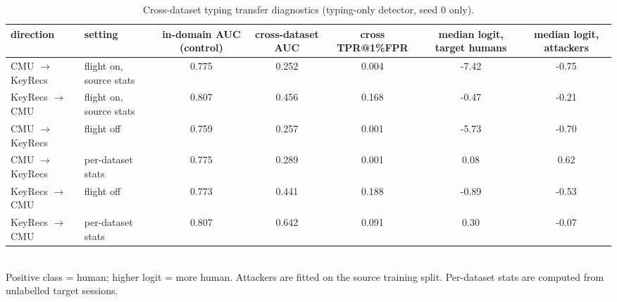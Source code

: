 \begin{table}[t]
\caption{Cross-dataset typing transfer diagnostics (typing-only detector, seed 0 only).}
\label{tab:transfer}
\centering
\small
\begin{tabular}{llccccc}
\toprule
direction & setting & in-domain AUC (control) & cross-dataset AUC & cross TPR@1\%FPR & median logit, target humans & median logit, attackers \\
\midrule
CMU $\to$ KeyRecs & flight on, source stats & 0.775 & 0.252 & 0.004 & -7.42 & -0.75 \\
KeyRecs $\to$ CMU & flight on, source stats & 0.807 & 0.456 & 0.168 & -0.47 & -0.21 \\
CMU $\to$ KeyRecs & flight off & 0.759 & 0.257 & 0.001 & -5.73 & -0.70 \\
CMU $\to$ KeyRecs & per-dataset stats & 0.775 & 0.289 & 0.001 & 0.08 & 0.62 \\
KeyRecs $\to$ CMU & flight off & 0.773 & 0.441 & 0.188 & -0.89 & -0.53 \\
KeyRecs $\to$ CMU & per-dataset stats & 0.807 & 0.642 & 0.091 & 0.30 & -0.07 \\
\bottomrule
\end{tabular}
\\[2pt]\footnotesize Positive class = human; higher logit = more human. Attackers are fitted on the source training split. Per-dataset stats are computed from unlabelled target sessions.
\end{table}

